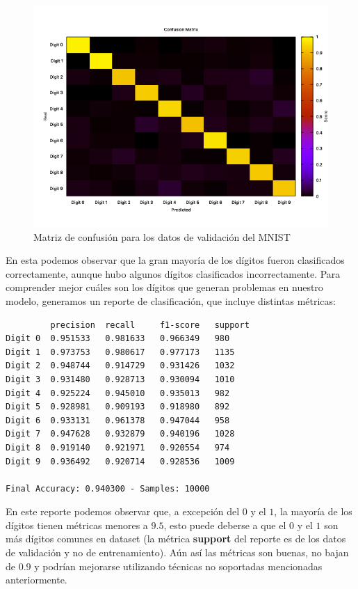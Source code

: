 \documentclass [a4paper,12pt,oneside,final]{article}
\begin{document}
\begin{figure}[ht]
  \centering
  \includegraphics[width=13cm,keepaspectratio]{./graficos/mnist_conf_matrix.png}
  \caption{Matriz de confusión para los datos de validación del MNIST}\label{fig:mnist_conf_matrix}
\end{figure}

En esta podemos observar que la gran mayoría de los dígitos fueron clasificados correctamente, aunque hubo algunos dígitos clasificados incorrectamente. Para comprender mejor cuáles son los dígitos que generan problemas en nuestro modelo, generamos un reporte de clasificación, que incluye distintas métricas:

\begin{verbatim}
         precision  recall     f1-score   support 
Digit 0  0.951533   0.981633   0.966349   980 
Digit 1  0.973753   0.980617   0.977173   1135 
Digit 2  0.948744   0.914729   0.931426   1032 
Digit 3  0.931480   0.928713   0.930094   1010 
Digit 4  0.925224   0.945010   0.935013   982 
Digit 5  0.928981   0.909193   0.918980   892 
Digit 6  0.933131   0.961378   0.947044   958 
Digit 7  0.947628   0.932879   0.940196   1028 
Digit 8  0.919140   0.921971   0.920554   974 
Digit 9  0.936492   0.920714   0.928536   1009 

Final Accuracy: 0.940300 - Samples: 10000
\end{verbatim}

En este reporte podemos observar que, a excepción del $0$ y el $1$, la mayoría de los dígitos tienen métricas menores a $9.5$, esto puede deberse a que el $0$ y el $1$ son más dígitos comunes en dataset (la métrica {\bf support} del reporte es de los datos de validación y no de entrenamiento). Aún así las métricas son buenas, no bajan de $0.9$ y podrían mejorarse utilizando técnicas no soportadas mencionadas anteriormente.
\end{document}
